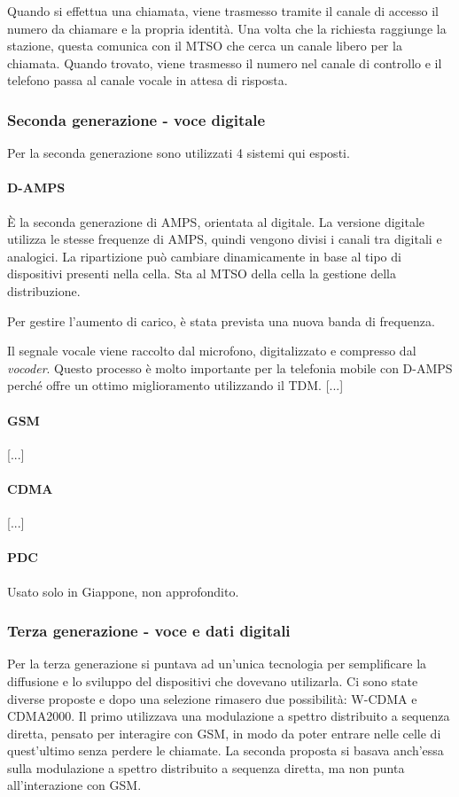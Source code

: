 Quando si effettua una chiamata, viene trasmesso tramite il canale di accesso il numero da chiamare e la propria identità.
Una volta che la richiesta raggiunge la stazione, questa comunica con il MTSO che cerca un canale libero per la chiamata.
Quando trovato, viene trasmesso il numero nel canale di controllo e il telefono passa al canale vocale in attesa di risposta.

\subsubsection{Seconda generazione - voce digitale}
Per la seconda generazione sono utilizzati 4 sistemi qui esposti.

\paragraph{D-AMPS}
\`E la seconda generazione di AMPS, orientata al digitale. 
La versione digitale utilizza le stesse frequenze di AMPS, quindi vengono divisi i canali tra digitali e analogici.
La ripartizione può cambiare dinamicamente in base al tipo di dispositivi presenti nella cella. 
Sta al MTSO della cella la gestione della distribuzione.

Per gestire l'aumento di carico, è stata prevista una nuova banda di frequenza. 

Il segnale vocale viene raccolto dal microfono, digitalizzato e compresso dal \textit{vocoder}.
Questo processo è molto importante per la telefonia mobile con D-AMPS perché offre un ottimo miglioramento utilizzando il TDM. 
[...]

\paragraph{GSM}
[...]

\paragraph{CDMA}
[...]

\paragraph{PDC}
Usato solo in Giappone, non approfondito.

\subsubsection{Terza generazione - voce e dati digitali}
Per la terza generazione si puntava ad un'unica tecnologia per semplificare la diffusione e lo sviluppo del dispositivi che dovevano utilizarla.
Ci sono state diverse proposte e dopo una selezione rimasero due possibilità: W-CDMA e CDMA2000.
Il primo utilizzava una modulazione a spettro distribuito a sequenza diretta, pensato per interagire con GSM, in modo da poter entrare nelle celle di quest'ultimo senza perdere le chiamate.
La seconda proposta si basava anch'essa sulla modulazione a spettro distribuito a sequenza diretta, ma non punta all'interazione con GSM. 

